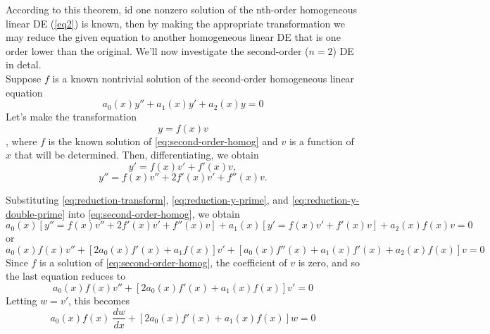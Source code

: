According to this theorem, id one nonzero solution of the nth-order homogeneous linear DE (\ref{eq2}) is known, then by making the appropriate transformation we may reduce the given equation to another homogeneous linear DE that is one order lower than the original. We'll now investigate the second-order ($n=2$) DE in detal.\\

Suppose $f$ is a known nontrivial solution of the second-order homogeneous linear equation
\begin{equation}
    \label{eq:second-order-homog}
    \tag{3.1.5}
    a_0(x)y'' + a_1(x)y' + a_2(x)y = 0
\end{equation}
Let's make the transformation
\begin{equation}
    \label{eq:reduction-transform}
    \tag{3.1.6}
    y = f(x)v
\end{equation}
, where $f$ is the known solution of \eqref{eq:second-order-homog} and $v$ is a function of $x$ that will be determined. Then, differentiating, we obtain
\begin{equation}
    \label{eq:reduction-y-prime}
    \tag{3.1.7}
    y' = f(x)v' + f'(x)v,
\end{equation}
\begin{equation}
    \label{eq:reduction-y-double-prime}
    \tag{3.1.8}
    y'' = f(x)v'' + 2f'(x)v' + f''(x)v.
\end{equation}

Substituting \eqref{eq:reduction-transform}, \eqref{eq:reduction-y-prime}, and \eqref{eq:reduction-y-double-prime} into \eqref{eq:second-order-homog}, we obtain \[
    a_0(x)[ y'' = f(x)v'' + 2f'(x)v' + f''(x)v ] + a_1(x)[ y' = f(x)v' + f'(x)v ] + a_2(x)f(x)v = 0
\] or \[
a_0(x)f(x)v'' + [ 2a_0(x)f'(x) + a_1f(x) ]v' + [ a_0(x)f''(x) + a_1(x)f'(x) + a_2(x)f(x) ]v = 0
\]
Since $f$ is a solution of \eqref{eq:second-order-homog}, the coefficient of $v$ is zero, and so the last equation reduces to \[
    a_0(x)f(x)v'' + [ 2a_0(x)f'(x) + a_1(x)f(x) ]v' = 0
\]
Letting $w = v'$, this becomes
\begin{equation}
    \label{eq:reduction-w}
    \tag{3.1.9}
    a_0(x)f(x) \: \frac{dw}{dx} + [ 2a_0(x)f'(x) + a_1(x)f(x) ]w = 0
\end{equation}

